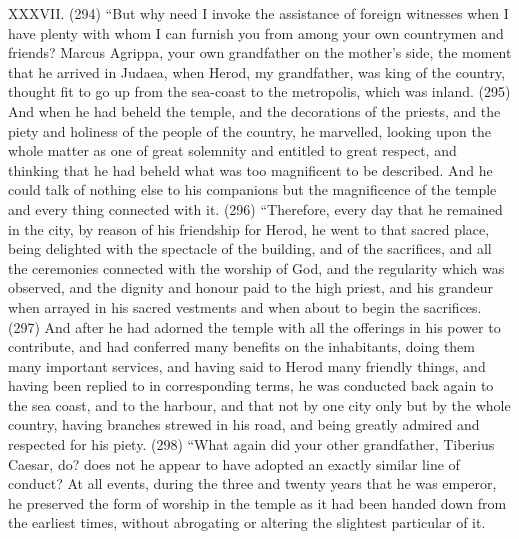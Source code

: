 XXXVII. (294) ``But why need I invoke the assistance of foreign witnesses when I have plenty with
whom I can furnish you from among your own countrymen and friends? Marcus Agrippa, your own
grandfather on the mother's side, the moment that he arrived in Judaea, when Herod, my
grandfather, was king of the country, thought fit to go up from the sea-coast to the metropolis,
which was inland. (295) And when he had beheld the temple, and the decorations of the priests,
and the piety and holiness of the people of the country, he marvelled, looking upon the whole matter
as one of great solemnity and entitled to great respect, and thinking that he had beheld what was
too magnificent to be described. And he could talk of nothing else to his companions but the
magnificence of the temple and every thing connected with it. (296) ``Therefore, every day that he
remained in the city, by reason of his friendship for Herod, he went to that sacred place, being
delighted with the spectacle of the building, and of the sacrifices, and all the ceremonies connected
with the worship of God, and the regularity which was observed, and the dignity and honour paid to
the high priest, and his grandeur when arrayed in his sacred vestments and when about to begin
the sacrifices. (297) And after he had adorned the temple with all the offerings in his power to
contribute, and had conferred many benefits on the inhabitants, doing them many important
services, and having said to Herod many friendly things, and having been replied to in
corresponding terms, he was conducted back again to the sea coast, and to the harbour, and that
not by one city only but by the whole country, having branches strewed in his road, and being
greatly admired and respected for his piety. (298) ``What again did your other grandfather, Tiberius
Caesar, do? does not he appear to have adopted an exactly similar line of conduct? At all events,
during the three and twenty years that he was emperor, he preserved the form of worship in the
temple as it had been handed down from the earliest times, without abrogating or altering the
slightest particular of it.

